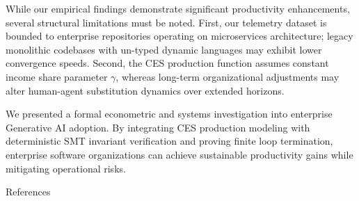 \documentclass[10pt,twocolumn,letterpaper]{article}
\begin{document}
While our empirical findings demonstrate significant productivity enhancements, several structural limitations must be noted. First, our telemetry dataset is bounded to enterprise repositories operating on microservices architecture; legacy monolithic codebases with un-typed dynamic languages may exhibit lower convergence speeds. Second, the CES production function assumes constant income share parameter $\gamma$, whereas long-term organizational adjustments may alter human-agent substitution dynamics over extended horizons.



We presented a formal econometric and systems investigation into enterprise Generative AI adoption. By integrating CES production modeling with deterministic SMT invariant verification and proving finite loop termination, enterprise software organizations can achieve sustainable productivity gains while mitigating operational risks.

References

\cite{crossref_10_2139_ssrn_6374778}


\par\vspace{0.5em}



\end{document}

